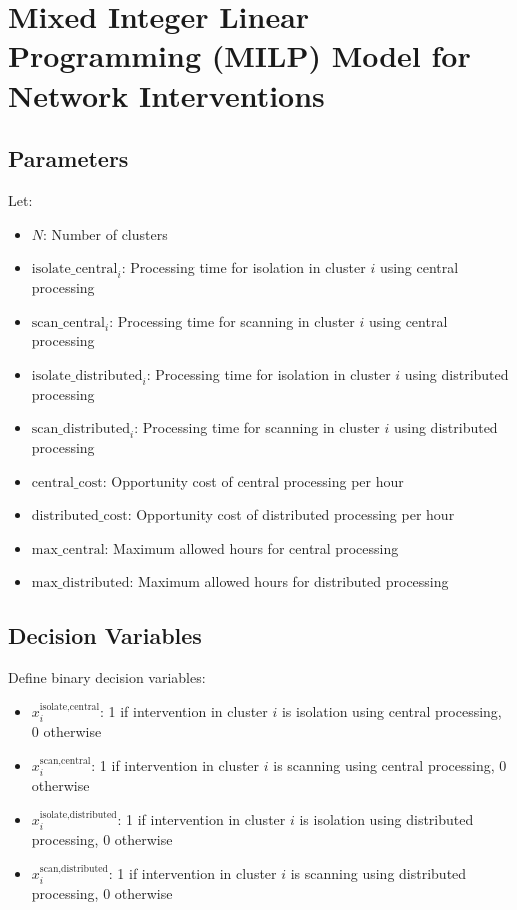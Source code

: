 \documentclass{article}
\begin{document}
\section*{Mixed Integer Linear Programming (MILP) Model for Network Interventions}

\subsection*{Parameters}
Let:
\begin{itemize}
    \item \( N \): Number of clusters
    \item \( \text{isolate\_central}_{i} \): Processing time for isolation in cluster \( i \) using central processing
    \item \( \text{scan\_central}_{i} \): Processing time for scanning in cluster \( i \) using central processing
    \item \( \text{isolate\_distributed}_{i} \): Processing time for isolation in cluster \( i \) using distributed processing
    \item \( \text{scan\_distributed}_{i} \): Processing time for scanning in cluster \( i \) using distributed processing
    \item \( \text{central\_cost} \): Opportunity cost of central processing per hour
    \item \( \text{distributed\_cost} \): Opportunity cost of distributed processing per hour
    \item \( \text{max\_central} \): Maximum allowed hours for central processing
    \item \( \text{max\_distributed} \): Maximum allowed hours for distributed processing
\end{itemize}

\subsection*{Decision Variables}
Define binary decision variables:
\begin{itemize}
    \item \( x_{i}^{\text{isolate,central}} \): 1 if intervention in cluster \( i \) is isolation using central processing, 0 otherwise
    \item \( x_{i}^{\text{scan,central}} \): 1 if intervention in cluster \( i \) is scanning using central processing, 0 otherwise
    \item \( x_{i}^{\text{isolate,distributed}} \): 1 if intervention in cluster \( i \) is isolation using distributed processing, 0 otherwise
    \item \( x_{i}^{\text{scan,distributed}} \): 1 if intervention in cluster \( i \) is scanning using distributed processing, 0 otherwise
\end{itemize}
\end{document}
